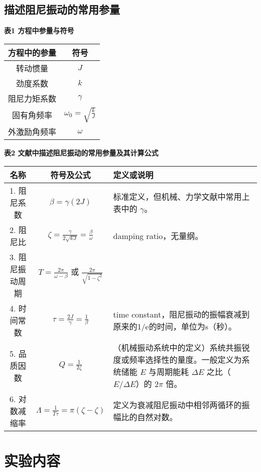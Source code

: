 \documentclass[12pt,a4paper]{amsart}
\begin{document}
\subsection{描述阻尼振动的常用参量}

\textbf{表1 方程中参量与符号}

\begin{center}
\begin{tabular}{|c|c|}
\hline
方程中的参量 & 符号 \\
\hline
转动惯量 & $J$ \\
劲度系数 & $k$ \\
阻尼力矩系数 & $\gamma$ \\
固有角频率 & $\omega_0 = \sqrt{\frac{k}{J}}$ \\
外激励角频率 & $\omega$ \\
\hline
\end{tabular}
\end{center}

\textbf{表2 文献中描述阻尼振动的常用参量及其计算公式}

\begin{center}
\begin{tabular}{|c|c|p{6cm}|}
\hline
名称 & 符号及公式 & 定义或说明 \\
\hline
1. 阻尼系数 & $\beta = \gamma (2J)$ & 标准定义，但机械、力学文献中常用上表中的 $\gamma$。 \\
2. 阻尼比 & $\zeta = \frac{\gamma}{2 \sqrt{kJ}} = \frac{\beta}{\omega}$ & damping ratio，无量纲。 \\
3. 阻尼振动周期 & $T = \frac{2\pi}{\omega - \beta}$ 或 $\frac{2\pi}{\sqrt{1 - \zeta^2}}$ & \\
4. 时间常数 & $\tau = \frac{2J}{\gamma} = \frac{1}{\beta}$ & time constant，阻尼振动的振幅衰减到原来的1/e的时间，单位为s（秒）。 \\
5. 品质因数 & $Q = \frac{1}{2\zeta}$ & （机械振动系统中的定义）系统共振锐度或频率选择性的量度。一般定义为系统储能 $E$ 与周期能耗 $\Delta E$ 之比（$E/\Delta E$）的 $2\pi$ 倍。 \\
6. 对数减缩率 & $\Lambda = \frac{1}{T\tau} = \pi(\zeta - \zeta)$ & 定义为衰减阻尼振动中相邻两循环的振幅比的自然对数。 \\
\hline
\end{tabular}
\end{center}

\section{实验内容}
\end{document}
